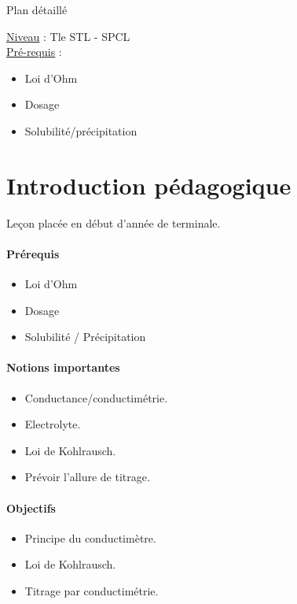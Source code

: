 \begin{reportBlock}{Plan détaillé}

\underline{Niveau} : Tle STL - SPCL \\

\underline{Pré-requis} :
\begin{itemize}
\item Loi d'Ohm
\item Dosage
\item Solubilité/précipitation
\end{itemize}


\section*{Introduction pédagogique}

Leçon placée en début d'année de terminale.

\paragraph*{Prérequis}
\begin{itemize}
\item Loi d'Ohm
\item Dosage
\item Solubilité / Précipitation
\end{itemize}

\paragraph*{Notions importantes}

\begin{itemize}
\item Conductance/conductimétrie.
\item Electrolyte.
\item Loi de Kohlrausch.
\item Prévoir l'allure de titrage.
\end{itemize}

\paragraph*{Objectifs}

\begin{itemize}
\item Principe du conductimètre.
\item Loi de Kohlrausch.
\item Titrage par conductimétrie.
\end{itemize}


\end{reportBlock}
